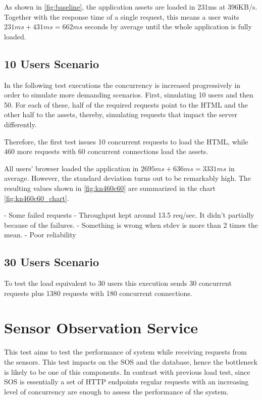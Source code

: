As shown in \ref{fig:baseline}, the application assets are loaded in 231ms at 396KB/s. Together with the response time of a single request, this means a user waits $231ms + 431ms = 662ms$ seconds by average until the whole application is fully loaded.

\subsection*{10 Users Scenario}

In the following test executions the concurrency is increased progressively in order to simulate more demanding scenarios. First, simulating 10 users and then 50. For each of these, half of the required requests point to the HTML and the other half to the assets, thereby, simulating requests that impact the server differently.

Therefore, the first test issues 10 concurrent requests to load the HTML, while 460 more requests with 60 concurrent connections load the assets.

All users' browser loaded the application in $2695ms + 636ms = 3331ms$ in average. However, the standard deviation turns out to be remarkably high. The resulting values shown in \ref{fig:kn460c60} are summarized in the chart \ref{fig:kn460c60_chart}.


- Some failed requests
- Throughput kept around 13.5 req/sec. It didn't partially because of the failures.
- Something is wrong when stdev is more than 2 times the mean.
- Poor reliability

\subsection*{30 Users Scenario}

To test the load equivalent to 30 users this execution sends 30 concurrent requests plus 1380 requests with 180 concurrent connections.

\section{Sensor Observation Service}

This test aims to test the performance of system while receiving requests from the sensors. This test impacts on the SOS and the database, hence the bottleneck is likely to be one of this components. In contrast with previous load test, since SOS is essentially a set of HTTP endpoints regular requests with an increasing level of concurrency are enough to assess the performance of the system.

